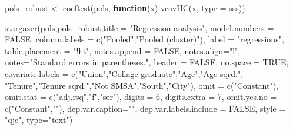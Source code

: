 \documentclass[
]{article}
\newenvironment{Shaded}{\begin{snugshade}}{\end{snugshade}}
\newcommand{\AttributeTok}[1]{\textcolor[rgb]{0.77,0.63,0.00}{#1}}
\newcommand{\ConstantTok}[1]{\textcolor[rgb]{0.00,0.00,0.00}{#1}}
\newcommand{\ControlFlowTok}[1]{\textcolor[rgb]{0.13,0.29,0.53}{\textbf{#1}}}
\newcommand{\DecValTok}[1]{\textcolor[rgb]{0.00,0.00,0.81}{#1}}
\newcommand{\FunctionTok}[1]{\textcolor[rgb]{0.00,0.00,0.00}{#1}}
\newcommand{\NormalTok}[1]{#1}
\newcommand{\OtherTok}[1]{\textcolor[rgb]{0.56,0.35,0.01}{#1}}
\newcommand{\StringTok}[1]{\textcolor[rgb]{0.31,0.60,0.02}{#1}}
\begin{document}
\begin{Shaded}
\begin{Highlighting}[]
\NormalTok{  pols\_robust }\OtherTok{\textless{}{-}} \FunctionTok{coeftest}\NormalTok{(pols, }\ControlFlowTok{function}\NormalTok{(x) }\FunctionTok{vcovHC}\NormalTok{(x, }\AttributeTok{type =} \StringTok{\textquotesingle{}sss\textquotesingle{}}\NormalTok{)) }
  
  \FunctionTok{stargazer}\NormalTok{(pols,pols\_robust,}\AttributeTok{title =} \StringTok{"Regression analysis"}\NormalTok{, }
            \AttributeTok{model.numbers =} \ConstantTok{FALSE}\NormalTok{,}
            \AttributeTok{column.labels =} \FunctionTok{c}\NormalTok{(}\StringTok{"Pooled"}\NormalTok{,}\StringTok{"Pooled (cluster)"}\NormalTok{),}
            \AttributeTok{label =} \StringTok{"regressions"}\NormalTok{,}
            \AttributeTok{table.placement =} \StringTok{"!ht"}\NormalTok{,}
            \AttributeTok{notes.append =} \ConstantTok{FALSE}\NormalTok{,}
            \AttributeTok{notes.align=}\StringTok{"l"}\NormalTok{,}
            \AttributeTok{notes=}\StringTok{"Standard errors in parentheses."}\NormalTok{,}
            \AttributeTok{header =} \ConstantTok{FALSE}\NormalTok{,}
            \AttributeTok{no.space =} \ConstantTok{TRUE}\NormalTok{,}
            \AttributeTok{covariate.labels =} \FunctionTok{c}\NormalTok{(}\StringTok{"Union"}\NormalTok{,}\StringTok{"Collage graduate"}\NormalTok{,}\StringTok{"Age"}\NormalTok{,}\StringTok{"Age sqrd."}\NormalTok{,}
                                 \StringTok{"Tenure"}\NormalTok{,}\StringTok{"Tenure sqrd."}\NormalTok{,}\StringTok{"Not SMSA"}\NormalTok{,}\StringTok{"South"}\NormalTok{,}\StringTok{"City"}\NormalTok{),}
            \AttributeTok{omit =} \FunctionTok{c}\NormalTok{(}\StringTok{"Constant"}\NormalTok{),}
            \AttributeTok{omit.stat =} \FunctionTok{c}\NormalTok{(}\StringTok{"adj.rsq"}\NormalTok{,}\StringTok{"f"}\NormalTok{,}\StringTok{"ser"}\NormalTok{),}
            \AttributeTok{digits =} \DecValTok{6}\NormalTok{,}
            \AttributeTok{digits.extra =} \DecValTok{7}\NormalTok{,}
            \AttributeTok{omit.yes.no =} \FunctionTok{c}\NormalTok{(}\StringTok{"Constant"}\NormalTok{,}\StringTok{""}\NormalTok{),}
            \AttributeTok{dep.var.caption=}\StringTok{""}\NormalTok{,}
            \AttributeTok{dep.var.labels.include =} \ConstantTok{FALSE}\NormalTok{,}
            \AttributeTok{style =} \StringTok{"qje"}\NormalTok{,}
            \AttributeTok{type=}\StringTok{"text"}\NormalTok{)}
\end{Highlighting}
\end{Shaded}
\end{document}

